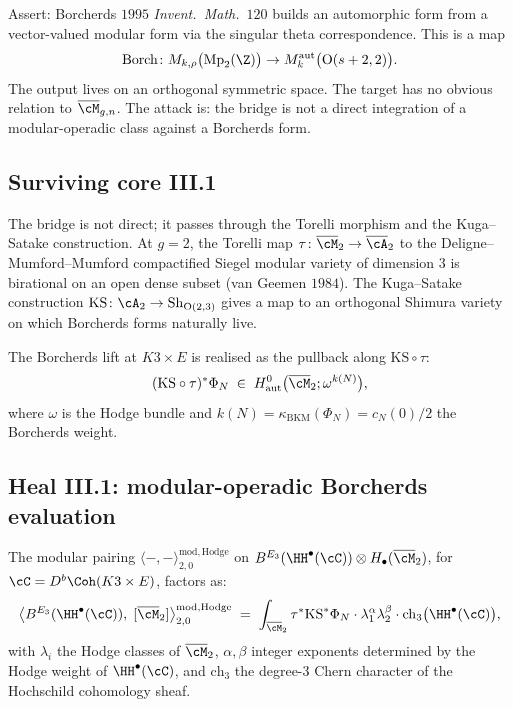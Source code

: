 Assert: Borcherds $1995$ \emph{Invent.~Math.}~$120$ builds an automorphic
form from a vector-valued modular form via the singular theta
correspondence. This is a map
\[
 \mathrm{Borch} \colon M_{k, \rho}\bigl(\mathrm{Mp}_2(\Z)\bigr) \to
 M_k^{\mathrm{aut}}\bigl(\mathrm{O}(s + 2, 2)\bigr).
\]
The output lives on an orthogonal symmetric space. The target has no
obvious relation to $\overline{\cM}_{g, n}$. The attack is: the bridge
is not a direct integration of a modular-operadic class against a
Borcherds form.

\subsection*{Surviving core III.1}

The bridge is not direct; it passes through the Torelli morphism and
the Kuga--Satake construction. At $g = 2$, the Torelli map
$\tau \colon \overline{\cM}_2 \to \overline{\cA}_2$ to the
Deligne--Mumford--Mumford compactified Siegel modular variety of
dimension $3$ is birational on an open dense subset (van Geemen
$1984$). The Kuga--Satake construction $\mathrm{KS} \colon \cA_2 \to
\mathrm{Sh}_{\mathrm{O}(2, 3)}$ gives a map to an orthogonal Shimura
variety on which Borcherds forms naturally live.

The Borcherds lift at $K3 \times E$ is realised as the pullback along
$\mathrm{KS} \circ \tau$:
\[
 (\mathrm{KS} \circ \tau)^*\Phi_N \;\in\;
 H_{\mathrm{aut}}^0\bigl(\overline{\cM}_2; \omega^{k(N)}\bigr),
\]
where $\omega$ is the Hodge bundle and $k(N) = \kappa_{\mathrm{BKM}}(\Phi_N)
= c_N(0)/2$ the Borcherds weight.

\subsection*{Heal III.1: modular-operadic Borcherds evaluation}

The modular pairing
$\langle -, - \rangle^{\mathrm{mod, Hodge}}_{2, 0}$ on
$B^{E_3}(\HH^\bullet(\cC)) \otimes H_\bullet(\overline{\cM}_2)$, for
$\cC = D^b\Coh(K3 \times E)$, factors as:
\begin{equation}
\label{eq:ks-modular-pairing}
 \bigl\langle B^{E_3}(\HH^\bullet(\cC)),\; [\overline{\cM}_2]
 \bigr\rangle^{\mathrm{mod, Hodge}}_{2, 0}
 \;=\; \int_{\overline{\cM}_2} \tau^* \mathrm{KS}^* \Phi_N \cdot
 \lambda_1^{\alpha} \lambda_2^{\beta} \cdot
 \mathrm{ch}_3\bigl(\HH^\bullet(\cC)\bigr),
\end{equation}
with $\lambda_i$ the Hodge classes of $\overline{\cM}_2$, $\alpha, \beta$
integer exponents determined by the Hodge weight of $\HH^\bullet(\cC)$,
and $\mathrm{ch}_3$ the degree-$3$ Chern character of the Hochschild
cohomology sheaf.

